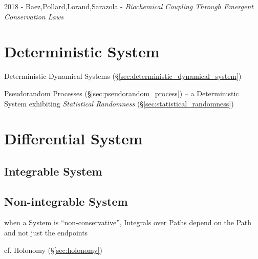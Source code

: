 2018 - Baez,Pollard,Lorand,Sarazola -
\emph{Biochemical Coupling Through Emergent Conservation Laws}



\section{Deterministic System}\label{sec:deterministic_system}

\fist Deterministic Dynamical Systems
(\S\ref{sec:deterministic_dynamical_system})

\fist Pseudorandom Processes (\S\ref{sec:pseudorandom_process}) -- a
Deterministic System exhibiting \emph{Statistical Randomness}
(\S\ref{sec:statistical_randomness})



\section{Differential System}\label{sec:differential_system}




\subsection{Integrable System}\label{sec:integrable_system}

\subsection{Non-integrable System}\label{sec:nonintegrable_system}

when a System is ``non-conservative'', Integrals over Paths depend on the Path
and not just the endpoints

cf. Holonomy (\S\ref{sec:holonomy})



